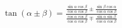 \documentclass[preview]{standalone}
\begin{document}
\begin{align*}
\tan(\alpha \pm \beta) = \frac{\frac{\sin\alpha\cos\beta}{\cos\alpha\cos\beta}\pm\frac{\sin\beta\cos\alpha}{\cos\alpha\cos\beta}}{\frac{\cos\alpha\cos\beta}{\cos\alpha\cos\beta}\mp\frac{\sin\alpha\sin\beta}{\cos\alpha\cos\beta}}
\end{align*}
\end{document}
